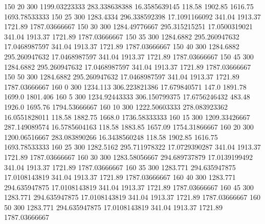 150  20  300  1199.03223333  283.338638388  16.3585639145  118.58  1902.85  1616.75  1693.78533333 
150  25  300  1283.4334  296.338592398  17.1091166092  341.04  1913.37  1721.89  1787.03666667 
150  30  300  1284.49776667  295.315215251  17.0500319021  341.04  1913.37  1721.89  1787.03666667 
150  35  300  1284.6882  295.260947632  17.0468987597  341.04  1913.37  1721.89  1787.03666667 
150  40  300  1284.6882  295.260947632  17.0468987597  341.04  1913.37  1721.89  1787.03666667 
150  45  300  1284.6882  295.260947632  17.0468987597  341.04  1913.37  1721.89  1787.03666667 
150  50  300  1284.6882  295.260947632  17.0468987597  341.04  1913.37  1721.89  1787.03666667 
160  0  300  1234.113  306.223821386  17.679840571  147.0  1891.78  1699.0  1801.406 
160  5  300  1234.92443333  306.150799375  17.6756246432  483.48  1926.0  1695.76  1794.53666667 
160  10  300  1222.50603333  278.083923362  16.0551828011  118.58  1882.75  1668.0  1736.58333333 
160  15  300  1209.33426667  287.149089574  16.5785604163  118.58  1883.85  1657.09  1754.31866667 
160  20  300  1200.06516667  283.083890266  16.3438560248  118.58  1902.85  1616.75  1693.78533333 
160  25  300  1282.5162  295.711978322  17.0729390287  341.04  1913.37  1721.89  1787.03666667 
160  30  300  1283.58056667  294.689737879  17.0139199492  341.04  1913.37  1721.89  1787.03666667 
160  35  300  1283.771  294.635947875  17.0108143819  341.04  1913.37  1721.89  1787.03666667 
160  40  300  1283.771  294.635947875  17.0108143819  341.04  1913.37  1721.89  1787.03666667 
160  45  300  1283.771  294.635947875  17.0108143819  341.04  1913.37  1721.89  1787.03666667 
160  50  300  1283.771  294.635947875  17.0108143819  341.04  1913.37  1721.89  1787.03666667 
